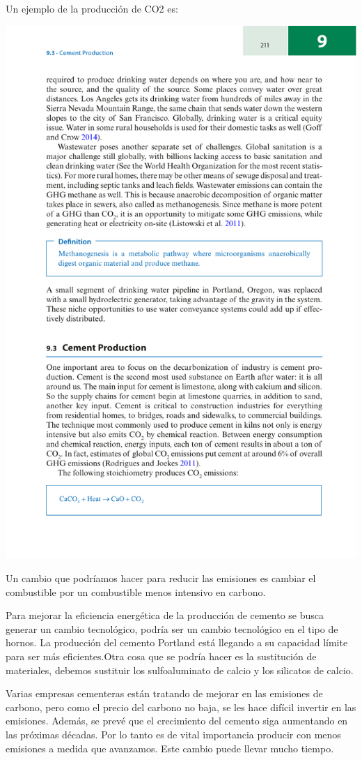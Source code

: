 \documentclass[runningheads]{llncs}
\begin{document}
Un ejemplo de la producción de CO2 es:
\begin{center}\includegraphics{formula.pdf}\end{center}
Un cambio que podríamos hacer para reducir las emisiones es cambiar el combustible por un combustible menos intensivo en carbono. 

Para mejorar la eficiencia energética de la producción de cemento se busca generar un cambio tecnológico, podría ser un cambio tecnológico en el tipo de hornos. La producción del cemento Portland  está llegando a su capacidad límite  para ser más eficientes.Otra cosa que se podría hacer es la sustitución de materiales, debemos sustituir los sulfoaluminato de calcio y los silicatos de calcio. 
 
Varias empresas cementeras están tratando de mejorar en las emisiones de carbono, pero como el precio del carbono no baja, se les hace difícil invertir en las emisiones. 
Además, se prevé que el crecimiento del cemento siga aumentando en las próximas décadas. Por lo tanto es de vital importancia producir con menos emisiones a medida que avanzamos.
Este cambio puede llevar mucho tiempo. 
\end{document}
